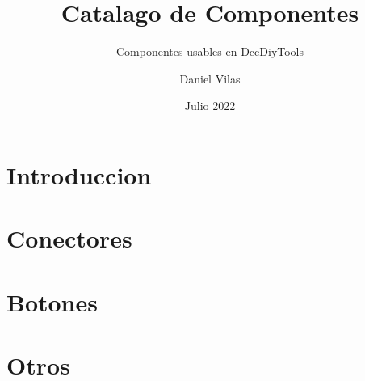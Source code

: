 \documentclass[spanish]{DccDiyTools/DccDiyTools}
\title{Catalago de Componentes}
\subtitle{Componentes usables en DccDiyTools}
\author{Daniel Vilas}
\date{Julio 2022}
\begin{document}
\maketitle

\section{Introduccion}


\newpage
\section{Conectores}


\newpage
\section{Botones}


\newpage
\section{Otros}

\end{document}
